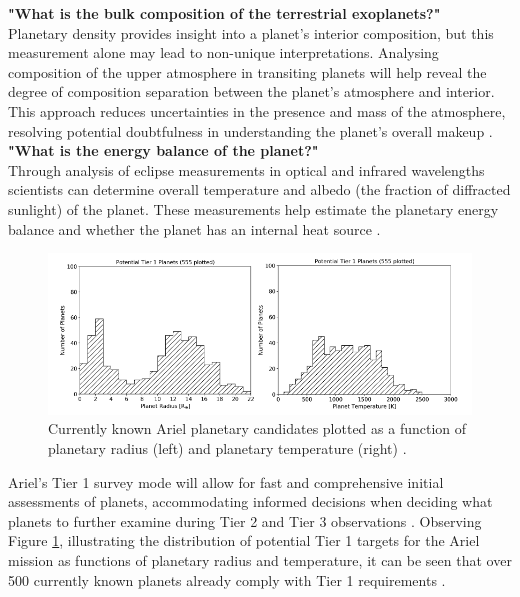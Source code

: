 \documentclass[12pt]{article}
\begin{document}
\textbf{"What is the bulk composition of the terrestrial exoplanets?"}\\
Planetary density provides insight into a planet's interior composition, but this measurement alone may lead to non-unique interpretations. Analysing composition of the upper atmosphere in transiting planets will help reveal the degree 
of composition separation between the planet's atmosphere and interior. This approach reduces uncertainties in the presence and mass of the atmosphere, resolving potential doubtfulness in understanding the planet's overall makeup \cite{salvignol2024ariel}. \\

\textbf{"What is the energy balance of the planet?"}\\
Through analysis of eclipse measurements in optical and infrared wavelengths scientists can determine overall temperature and albedo (the fraction of diffracted sunlight) of the planet. These measurements
help estimate the planetary energy balance and whether the planet has an internal heat source \cite{salvignol2024ariel}.

\begin{figure}[H]
    \centering
    \includegraphics[width=.9\textwidth]{tier 1 radius and temp plots.png}
    \caption{Currently known Ariel planetary candidates plotted as a function of planetary radius (left) and planetary temperature (right) \protect\cite{arielstudyreport}.}
    \label{fig:2}
\end{figure}

Ariel's Tier 1 survey mode will allow for fast and comprehensive initial assessments of planets, accommodating informed decisions when deciding what planets to further examine during Tier 2 and Tier 3 observations \cite{salvignol2024ariel}.
Observing Figure \ref{fig:2}, illustrating the distribution of potential Tier 1 targets for the Ariel mission as functions of planetary radius and temperature, it can be seen that over 500 currently known planets already comply with Tier 1 requirements \cite{arielstudyreport,edwards2019updated}.
\end{document}
